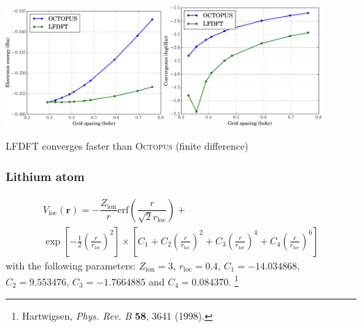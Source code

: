 \documentclass[10pt,t]{beamer}
\begin{document}
\begin{frame}[plain,c]
  
{\centering
\includegraphics[width=0.45\textwidth]{images/atom_H.pdf}\includegraphics[width=0.45\textwidth]{images/CONV_atom_H.pdf}
\par
LFDFT converges faster than \textsc{Octopus} (finite difference)
\par}
  
\end{frame}


\begin{frame}
\frametitle{Lithium atom}

\begin{multline*}
V_{\mathrm{loc}}(\mathbf{r}) = 
-\dfrac{Z_{\mathrm{ion}}}{r}
\mathrm{erf}\left(
\dfrac{r}{\sqrt{2}r_{\mathrm{loc}}}
\right) + \\
\exp
\left[ -\frac{1}{2}
\left( \frac{r}{r_{\mathrm{loc}}}\right)^2
\right]
\times
\left[
C_{1} +
C_{2}\left( \frac{r}{r_{\mathrm{loc}}}\right)^2 +
C_{3}\left( \frac{r}{r_{\mathrm{loc}}}\right)^4 +
C_{4}\left( \frac{r}{r_{\mathrm{loc}}}\right)^6
\right]
\end{multline*}
with the following parameters:
$Z_{\mathrm{ion}} = 3$, $r_{\mathrm{loc}} = 0.4$,
$C_{1} = -14.034868$, $C_{2} = 9.553476$, $C_{3} = -1.7664885$
and $C_{4} = 0.084370$.
\footnote{
  Hartwigsen, \textit{Phys. Rev. B}  \textbf{58}, 3641 (1998). 
}


\end{frame}
\end{document}
